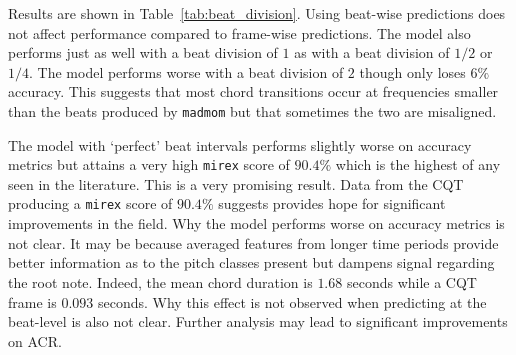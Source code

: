 Results are shown in Table~\ref{tab:beat_division}. Using beat-wise predictions does not affect performance compared to frame-wise predictions. The model also performs just as well with a beat division of $1$ as with a beat division of $1/2$ or $1/4$. The model performs worse with a beat division of $2$ though only loses $6\%$ accuracy. This suggests that most chord transitions occur at frequencies smaller than the beats produced by \texttt{madmom} but that sometimes the two are misaligned.

The model with `perfect' beat intervals performs slightly worse on accuracy metrics but attains a very high \texttt{mirex} score of $90.4\%$ which is the highest of any seen in the literature. This is a very promising result. Data from the CQT producing a \texttt{mirex} score of $90.4\%$ suggests provides hope for significant improvements in the field. Why the model performs worse on accuracy metrics is not clear. It may be because averaged features from longer time periods provide better information as to the pitch classes present but dampens signal regarding the root note. Indeed, the mean chord duration is $1.68$ seconds while a CQT frame is $0.093$ seconds. Why this effect is not observed when predicting at the beat-level is also not clear. Further analysis may lead to significant improvements on ACR.

